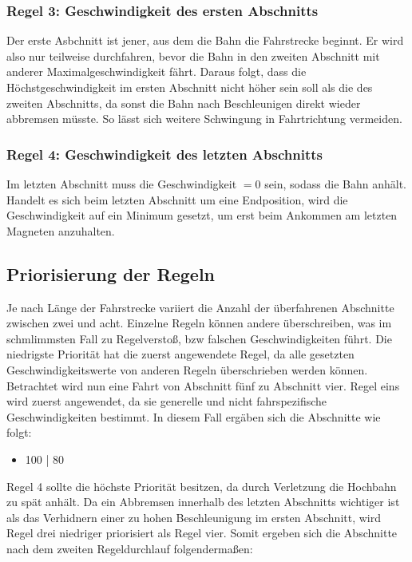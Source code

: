 \subsubsection{Regel 3: Geschwindigkeit des ersten Abschnitts}
Der erste Asbchnitt ist jener, aus dem die Bahn die Fahrstrecke beginnt. Er wird also nur teilweise durchfahren, bevor die Bahn in den zweiten Abschnitt mit anderer Maximalgeschwindigkeit fährt. Daraus folgt, dass die Höchstgeschwindigkeit im ersten Abschnitt nicht höher sein soll als die des zweiten Abschnitts, da sonst die Bahn nach Beschleunigen direkt wieder abbremsen müsste. So lässt sich weitere Schwingung in Fahrtrichtung vermeiden.

\subsubsection{Regel 4: Geschwindigkeit des letzten Abschnitts}
Im letzten Abschnitt muss die Geschwindigkeit $= 0$ sein, sodass die Bahn anhält. Handelt es sich beim letzten Abschnitt um eine Endposition, wird die Geschwindigkeit auf ein Minimum gesetzt, um erst beim Ankommen am letzten Magneten anzuhalten.  

\subsection{Priorisierung der Regeln}
Je nach Länge der Fahrstrecke variiert die Anzahl der überfahrenen Abschnitte zwischen zwei und acht. Einzelne Regeln können andere überschreiben, was im schmlimmsten Fall zu Regelverstoß, bzw falschen Geschwindigkeiten führt. Die niedrigste Priorität hat die zuerst angewendete Regel, da alle gesetzten Geschwindigkeitswerte von anderen Regeln überschrieben werden können.
\\
Betrachtet wird nun eine Fahrt von Abschnitt fünf zu Abschnitt vier. Regel eins wird zuerst angewendet, da sie generelle und nicht fahrspezifische Geschwindigkeiten bestimmt. In diesem Fall ergäben sich die Abschnitte wie folgt:

\begin{center}
	\begin{itemize}
		\item 100 | 80
	\end{itemize}
\end{center}

Regel 4 sollte die höchste Priorität besitzen, da durch Verletzung die Hochbahn zu spät anhält. Da ein Abbremsen innerhalb des letzten Abschnitts wichtiger ist als das Verhidnern einer zu hohen Beschleunigung im ersten Abschnitt, wird Regel drei niedriger priorisiert als Regel vier. Somit ergeben sich die Abschnitte nach dem zweiten Regeldurchlauf folgendermaßen:

